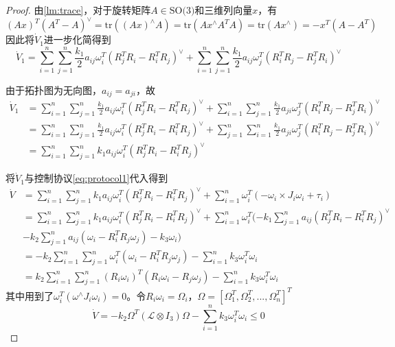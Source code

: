 \begin{theorem}
\begin{proof}
        由\ref{lm:trace}，对于旋转矩阵$A\in\text{SO(3)}$和三维列向量$x$，有
        \begin{equation}
            (Ax)^T(A^T-A)^\vee=\text{tr}((Ax)^\wedge A)=\text{tr}(Ax^\wedge A^TA)=\text{tr}(Ax^\wedge)=-x^T(A-A^T)
        \end{equation}
        因此将$\dot V_1$进一步化简得到
        \begin{equation}
            \dot V_1=\sum_{i=1}^n\sum_{j=1}^n\frac{k_1}{2}a_{ij}\omega_i^T(R_j^TR_i-R_i^TR_j)^\vee+\sum_{i=1}^n\sum_{j=1}^n\frac{k_1}{2}a_{ij}\omega_j^T(R_i^TR_j-R_j^TR_i)^\vee
        \end{equation}
        
        由于拓扑图为无向图，$a_{ij}=a_{ji}$，故
        \begin{equation}
            \begin{aligned}
                \dot V_1&=\sum_{i=1}^n\sum_{j=1}^n\frac{k_1}{2}a_{ij}\omega_i^T(R_j^TR_i-R_i^TR_j)^\vee+\sum_{i=1}^n\sum_{j=1}^n\frac{k_1}{2}a_{ji}\omega_j^T(R_i^TR_j-R_j^TR_i)^\vee\\
                &=\sum_{i=1}^n\sum_{j=1}^n\frac{k_1}{2}a_{ij}\omega_i^T(R_j^TR_i-R_i^TR_j)^\vee+\sum_{j=1}^n\sum_{i=1}^n\frac{k_1}{2}a_{ji}\omega_j^T(R_i^TR_j-R_j^TR_i)^\vee\\
                &=\sum_{i=1}^n\sum_{j=1}^nk_1a_{ij}\omega_i^T(R_j^TR_i-R_i^TR_j)^\vee
                \end{aligned}
        \end{equation}
        
        将$\dot V_1$与控制协议\ref{eq:protocol1}代入得到
        \begin{equation}
            \begin{aligned}
                \dot V&=\sum_{i=1}^n\sum_{j=1}^nk_1a_{ij}\omega_i^T(R_j^TR_i-R_i^TR_j)^\vee+\sum_{i=1}^n\omega_i^T(-\omega_i\times J_i\omega_i+\tau_i)\\
                &=\sum_{i=1}^n\sum_{j=1}^nk_1a_{ij}\omega_i^T(R_j^TR_i-R_i^TR_j)^\vee+\sum_{i=1}^n\omega_i^T(-k_1\sum_{j=1}^na_{ij}(R_j^TR_i-R_i^TR_j)^{\vee}\\
                &-k_2\sum_{j=1}^na_{ij}(\omega_i-R_i^TR_j\omega_j)-k_3\omega_i)\\
                &=-k_2\sum_{i=1}^n\sum_{j=1}^n\omega_i^T(\omega_i-R_i^TR_j\omega_j)-\sum_{i=1}^nk_3\omega_i^T\omega_i\\
                &=k_2\sum_{i=1}^n\sum_{j=1}^n(R_i\omega_i)^T(R_i\omega_i-R_j\omega_j)-\sum_{i=1}^nk_3\omega_i^T\omega_i
                \end{aligned}
        \end{equation}
        其中用到了$\omega_i^T(\omega^\wedge J_i\omega_i)=0$。令$R_i\omega_i=\Omega_i$，$\Omega=[\Omega_1^T,\Omega_2^T,...,\Omega_n^T]^T$
        \begin{equation}
            \dot V=-k_2\Omega^T(\mathcal{L}\otimes I_3)\Omega-\sum_{i=1}^nk_3\omega_i^T\omega_i\leq0
        \end{equation}


\end{proof}
\end{theorem}
